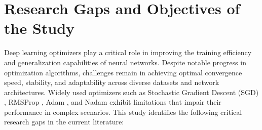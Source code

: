 \documentclass{article}
\begin{document}
\section{Research Gaps and Objectives of the Study}\label{Sec 3}



Deep learning optimizers play a critical role in improving the training efficiency and generalization capabilities of neural networks. Despite notable progress in optimization algorithms, challenges remain in achieving optimal convergence speed, stability, and adaptability across diverse datasets and network architectures. Widely used optimizers such as Stochastic Gradient Descent (SGD) \cite{Robbins1951}, RMSProp \cite{Tieleman2012}, Adam \cite{kingma2014adam}, and Nadam \cite{Dozat2016} exhibit limitations that impair their performance in complex scenarios. This study identifies the following critical research gaps in the current literature:
\end{document}
